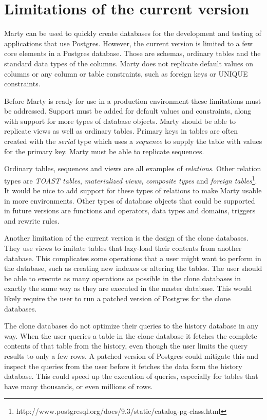 \section{Limitations of the current version}
Marty can be used to quickly create databases for the development and testing of applications that use Postgres.
However, the current version is limited to a few core elements in a Postgres database.
Those are schemas, ordinary tables and the standard data types of the columns.
Marty does not replicate default values on columns or any column or table constraints, such as foreign keys or UNIQUE constraints.

Before Marty is ready for use in a production environment these limitations must be addressed.
Support must be added for default values and constraints, along with support for more types of database objects.
Marty should be able to replicate views as well as ordinary tables.
Primary keys in tables are often created with the \textit{serial} type which uses a \textit{sequence} to supply the table with values for the primary key.
Marty must be able to replicate sequences.

Ordinary tables, sequences and views are all examples of \textit{relations}.
Other relation types are \textit{TOAST tables}, \textit{materialized views}, \textit{composite types} and \textit{foreign tables}\footnote{http://www.postgresql.org/docs/9.3/static/catalog-pg-class.html}.
It would be nice to add support for these types of relations to make Marty usable in more environments.
Other types of database objects that could be supported in future versions are functions and operators, data types and domains, triggers and rewrite rules.

Another limitation of the current version is the design of the clone databases.
They use views to imitate tables that lazy-load their contents from another database.
This complicates some operations that a user might want to perform in the database, such as creating new indexes or altering the tables.
The user should be able to execute as many operations as possible in the clone databases in exactly the same way as they are executed in the master database.
This would likely require the user to run a patched version of Postgres for the clone databases.

The clone databases do not optimize their queries to the history database in any way.
When the user queries a table in the clone database it fetches the complete contents of that table from the history, even though the user limits the query results to only a few rows.
A patched version of Postgres could mitigate this and inspect the queries from the user before it fetches the data form the history database.
This could speed up the execution of queries, especially for tables that have many thousands, or even millions of rows.

